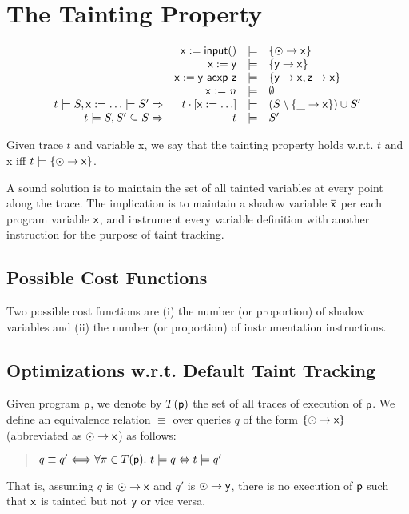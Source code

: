 \documentclass[]{article}
\begin{document}
\section{The Tainting Property}

$$
\begin{array}{rrcl}
& {\sf x := input()} & \models & \{ \odot \rightarrow {\sf x} \} \\
& {\sf x := y} & \models & \{ {\sf y} \rightarrow {\sf x} \}\\
& {\sf x := y\ aexp\ z} & \models & \{ {\sf y} \rightarrow {\sf x},{\sf z} \rightarrow {\sf x} \} \\
& \textsf{x := $n$} & \models & \emptyset\\
t \models S,{\sf x := \ldots} \models S' \Rightarrow & t \cdot [{\sf x := \ldots}] & \models & (S \setminus \{ \_ \rightarrow {\sf x} \}) \cup S' \\
t \models S,S' \subseteq S \Rightarrow & t & \models & S' \\
\end{array}
$$

Given trace $t$ and variable {\sf x}, we say that the tainting property holds w.r.t. $t$ and {\sf x} iff $t \models \{ \odot \rightarrow {\sf x} \}$.

A sound solution is to maintain the set of all tainted variables at every point along the trace. The implication is to maintain a shadow variable $\overline{{\sf x}}$ per each program variable ${\sf x}$, and instrument every variable definition with another instruction for the purpose of taint tracking. 

\subsection{Possible Cost Functions}

Two possible cost functions are (i) the number (or proportion) of shadow variables and (ii) the number (or proportion) of instrumentation instructions.

\subsection{Optimizations w.r.t. Default Taint Tracking} 

Given program ${\sf p}$, we denote by $T({\sf p})$ the set of all traces of execution of ${\sf p}$. We define an equivalence relation $\equiv$ over queries $q$ of the form $\{ \odot \rightarrow {\sf x} \}$ (abbreviated as $\odot \rightarrow {\sf x}$) as follows:
\begin{quote}
$q \equiv q'
\Longleftrightarrow \forall \pi \in T({\sf p}).\ t \models q \Leftrightarrow t \models q'$
\end{quote}
That is, assuming $q$ is $\odot \rightarrow {\sf x}$ and $q'$
is $\odot \rightarrow {\sf y}$, there is no execution of ${\sf p}$ such that ${\sf x}$ is tainted but not ${\sf y}$ or vice versa.
 
\end{document}
